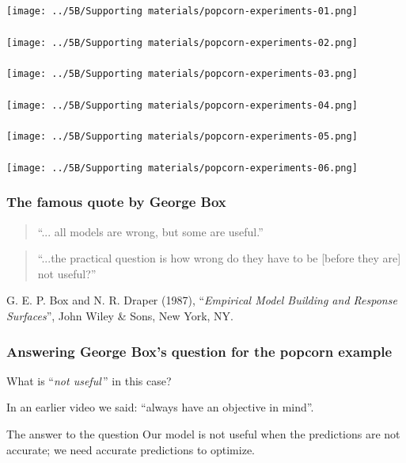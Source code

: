 \begin{frame}\frametitle{}
	\centerline{\texttt{[image: ../5B/Supporting materials/popcorn-experiments-01.png]}}
\end{frame}
\begin{frame}\frametitle{}
	\centerline{\texttt{[image: ../5B/Supporting materials/popcorn-experiments-02.png]}}
\end{frame}
\begin{frame}\frametitle{}
	\centerline{\texttt{[image: ../5B/Supporting materials/popcorn-experiments-03.png]}}
\end{frame}
\begin{frame}\frametitle{}
	\centerline{\texttt{[image: ../5B/Supporting materials/popcorn-experiments-04.png]}}
\end{frame}
\begin{frame}\frametitle{}
	\centerline{\texttt{[image: ../5B/Supporting materials/popcorn-experiments-05.png]}}
\end{frame}
\begin{frame}\frametitle{}
	\centerline{\texttt{[image: ../5B/Supporting materials/popcorn-experiments-06.png]}}
\end{frame}
\begin{frame}\frametitle{The famous quote by George Box}
	\begin{quote}
		``... all models are wrong, but some are useful.''
	\end{quote}
	
	\begin{quote}
		``...the practical question is how wrong do they have to be [before they are] not useful?''
	\end{quote}
	
	\vspace{1cm}
	G. E. P. Box and  N. R. Draper (1987), ``\emph{Empirical Model Building and Response Surfaces}'', John Wiley \& Sons, New York, NY.
\end{frame}
\begin{frame}\frametitle{Answering George Box's question for the popcorn example}
	
	What is ``\emph{not useful}\,'' in this case?
	
	\vspace{1cm}
	In an earlier video we said: ``always have an objective in mind''.
	
	\vspace{1cm}
	\begin{exampleblock}{The answer to the question}
		Our model is not useful when the predictions are not accurate; we need accurate predictions to optimize.
	\end{exampleblock}
\end{frame}
